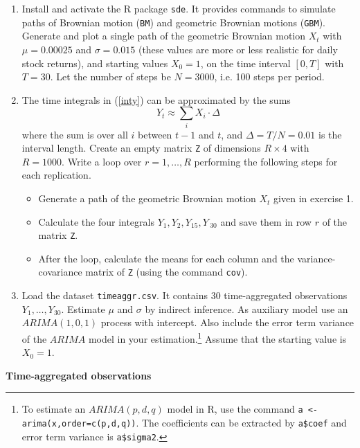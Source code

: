\documentclass{article}
\begin{document}
\begin{enumerate}
\item Install and activate the R package \texttt{sde}. It provides commands
to simulate paths of Brownian motion (\texttt{BM}) and geometric Brownian
motions (\texttt{GBM}). Generate and plot a single path of the geometric
Brownian motion $X_{t}$ with $\mu =0.00025$ and $\sigma =0.015$ (these
values are more or less realistic for daily stock returns), and starting
values $X_{0}=1$, on the time interval $[0,T]$ with $T=30$. Let the number
of steps be $N=3000$, i.e. 100 steps per period.

\item The time integrals in (\ref{inty}) can be approximated by the sums%
\begin{equation*}
Y_{t}\approx \sum_{i}X_{i}\cdot \Delta
\end{equation*}%
where the sum is over all $i$ between $t-1$ and $t$, and $\Delta =T/N=0.01$
is the interval length. Create an empty matrix \texttt{Z} of dimensions $%
R\times 4$ with $R=1000.$ Write a loop over $r=1,\ldots ,R$ performing the
following steps for each replication.

\begin{itemize}
\item Generate a path of the geometric Brownian motion $X_{t}$ given in
exercise 1.

\item Calculate the four integrals $Y_{1},Y_{2},Y_{15},Y\,_{30}$ and save
them in row $r$ of the matrix \texttt{Z}.

\item After the loop, calculate the means for each column and the
variance-covariance matrix of \texttt{Z} (using the command \texttt{cov}).
\end{itemize}

\item Load the dataset \texttt{timeaggr.csv}. It contains 30 time-aggregated
observations $Y_{1},\ldots ,Y_{30}$. Estimate $\mu $ and $\sigma $ by
indirect inference. As auxiliary model use an $ARIMA(1,0,1)$ process with
intercept. Also include the error term variance of the $ARIMA$ model in your
estimation.\footnote{%
To estimate an $ARIMA(p,d,q)$ model in R, use the command \texttt{a
<- arima(x,order=c(p,d,q))}. The coefficients can be extracted
by \texttt{a\$coef} and error term variance is \texttt{a\$sigma2}.} Assume
that the starting value is $X_{0}=1$.
\end{enumerate}

\begin{solution}
\textbf{Time-aggregated observations}
\end{solution}
\end{document}
